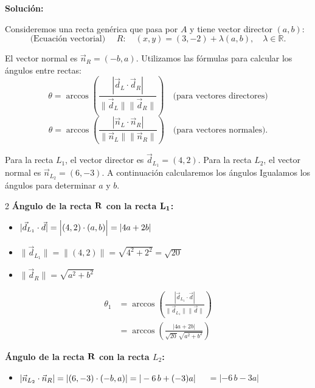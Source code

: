 \documentclass[11pt]{article}
\begin{document}
\begin{enumerate}[\hspace{-5mm} 1) ]
\textbf{Solución:}

Consideremos una recta genérica que pasa por $A$ y tiene vector director $(a, b)$:
\[ \text{(Ecuación vectorial) } \quad R :\quad  (x, y) = (3, -2) + \lambda (a, b), \quad \lambda \in \mathbb{R}. \]

El vector normal  es $\vec{n}_{R} =(-b, a)$. Utilizamos las fórmulas para calcular los ángulos entre rectas:
\[ \theta = \arccos\left( \frac{|\vec{d}_L \cdot \vec{d}_R|}{\|\vec{d}_L\| \|\vec{d}_R\|} \right) \quad \text{(para vectores directores)} \]
\[ \theta = \arccos\left( \frac{|\vec{n}_L \cdot \vec{n}_R|}{\|\vec{n}_L\| \|\vec{n}_R\|} \right) \quad \text{(para vectores normales)}. \]

Para la recta $L_1$, el vector director es $\vec{d}_{L_1} = (4, 2)$. Para la recta $L_2$, el vector normal es $\vec{n}_{L_2} = (6, -3)$. A continuación calcularemos los ángulos Igualamos los ángulos para determinar $a$ y $b$.



\begin{multicols}{2}
\textbf{Ángulo de la recta $\bf R$ con la recta $\bf L_1$:} 

\begin{itemize}
    \item $|\vec{d}_{L_1} \cdot \vec{d}|= \left| (4,2)  \cdot (a,b) \rule{0mm}{3.9mm}\right| =|4a + 2b|$

    \item $ \|\vec{d}_{L_1}\|   = \|(4,2) \| =  \sqrt{4^2 + 2^2} = \sqrt{20\,}$

    \item $\|\vec{d}_R  \| = \sqrt{a^2 + b^2} $

    
\end{itemize}



\begin{align*}
    \theta_1 &= \arccos\left( \frac{|\vec{d}_{L_1} \cdot \vec{d}|}{\|\vec{d}_{L_1}\| \|\vec{d}\|} \right) 
    \\[2mm]
    &= \arccos\left( \frac{|4a + 2b|}{\sqrt{20\,} \sqrt{a^2 + b^2}}  \right) 
\end{align*}


    \columnbreak %

\textbf{Ángulo  de la recta $\bf R$ con la recta $L_2$:} 

\begin{itemize}
    \item $|\vec{n}_{L_2} \cdot \vec{n}_R|= | (6,-3)\cdot (-b,a) \rule{0mm}{3.9mm}|=|-6 \, b + (-3)a|$ \linebreak  \, \qquad \, $= |-6 \, b -3a|  $


\end{itemize}
\end{multicols}
\end{enumerate}
\end{document}
